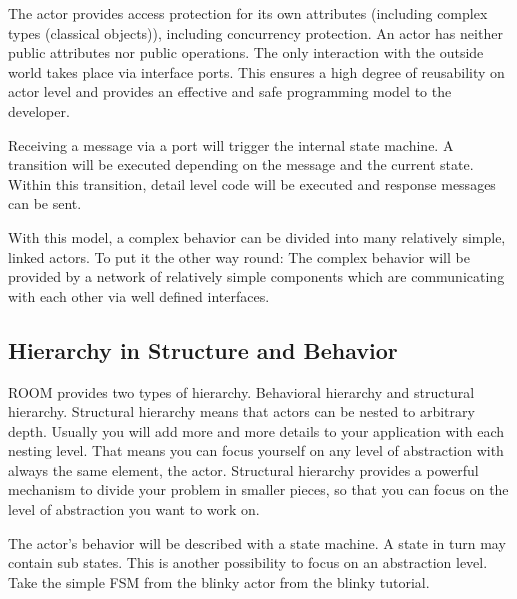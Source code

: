 
The actor provides access protection for its own attributes (including complex types (classical objects)), including concurrency protection. An actor has neither public attributes nor public operations. The only interaction with the outside world takes place via interface ports. This ensures a high degree of reusability on actor level and provides an effective and safe programming model to the developer. 

Receiving a message via a port will trigger the internal state machine. A transition will be executed depending on the message and the current state. Within this transition, detail level code will be executed and response messages can be sent.


With this model, a complex behavior can be divided into many relatively simple, linked actors. To put it the other way round: The complex behavior will be provided by a network of relatively simple components which are communicating with each other via well defined interfaces.


\subsection{Hierarchy in Structure and Behavior}

ROOM provides two types of hierarchy. Behavioral hierarchy and structural hierarchy. Structural hierarchy means that actors can be nested to arbitrary depth. Usually you will add more and more details to your application with each nesting level. That means you can focus yourself on any level of abstraction with always the same element, the actor. Structural hierarchy provides a powerful mechanism to divide your problem in smaller pieces, so that you can focus on the level of abstraction you want to work on. 

The actor's behavior will be described with a state machine. A state in turn may contain sub states. This is another possibility to focus on an abstraction level. Take the simple FSM from the blinky actor from the blinky tutorial. 
   
